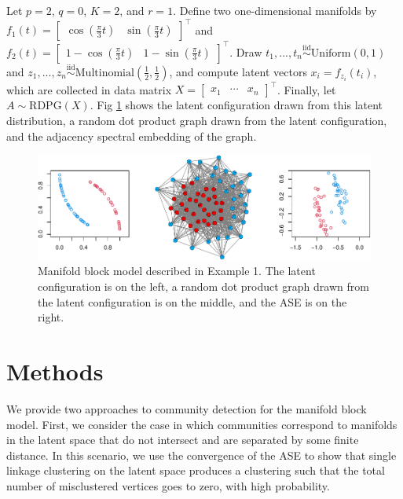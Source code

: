 \documentclass[12pt]{article}
\begin{document}
\begin{example}
Let $p = 2$, $q = 0$, $K = 2$, and $r = 1$. 
Define two one-dimensional manifolds by $f_1(t) = \begin{bmatrix} \cos(\frac{\pi}{3} t) & \sin(\frac{\pi}{3} t) \end{bmatrix}^\top$ and $f_2(t) = \begin{bmatrix} 1 - \cos(\frac{\pi}{3} t) & 1 - \sin(\frac{\pi}{3} t) \end{bmatrix}^\top$.
Draw $t_1, ..., t_n \stackrel{\mathrm{iid}}{\sim}\mathrm{Uniform}(0, 1)$ and $z_1, ..., z_n \stackrel{\mathrm{iid}}{\sim}\mathrm{Multinomial}(\frac{1}{2}, \frac{1}{2})$, and compute latent vectors $x_i = f_{z_i}(t_i)$, which are collected in data matrix $X = \begin{bmatrix} x_1 & \cdots & x_n \end{bmatrix}^\top$. 
Finally, let $A \sim \mathrm{RDPG}(X)$. Fig \ref{fig:example1} shows the latent configuration drawn from this latent distribution, a random dot product graph drawn from the latent configuration, and the adjacency spectral embedding of the graph. 

\begin{figure}[H]

{\centering \includegraphics{draft_files/figure-latex/example1-1} 

}

\caption{Manifold block model described in Example 1. The latent configuration is on the left, a random dot product graph drawn from the latent configuration is on the middle, and the ASE is on the right.}\label{fig:example1}
\end{figure}
\end{example}

\hypertarget{methods}{%
\section{Methods}\label{methods}}

We provide two approaches to community detection for the manifold block
model. First, we consider the case in which communities correspond to
manifolds in the latent space that do not intersect and are separated by
some finite distance. In this scenario, we use the convergence of the
ASE to show that single linkage clustering on the latent space produces
a clustering such that the total number of misclustered vertices goes to
zero, with high probability.
\end{document}
